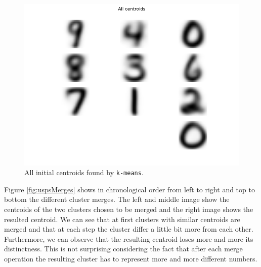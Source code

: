 \documentclass[a4paper, 12pt, titlepage]{article}
\begin{document}
\begin{figure}
	\centering
	\includegraphics[width=12cm]{images/allcentroids.png}
	\caption{All initial centroids found by \texttt{k-means}.}
	\label{fig:uspsInitialCentroids}
\end{figure}

Figure \ref{fig:uspsMerges} shows in chronological order from left to right and top to bottom the different cluster merges. 
The left and middle image show the centroids of the two clusters chosen to be merged and the right image shows the resulted centroid.
We can see that at first clusters with similar centroids are merged and that at each step the cluster differ a little bit more from each other.
Furthermore, we can observe that the resulting centroid loses more and more its distinctness.
This is not surprising considering the fact that after each merge operation the resulting cluster has to represent more and more different numbers.
\end{document}

